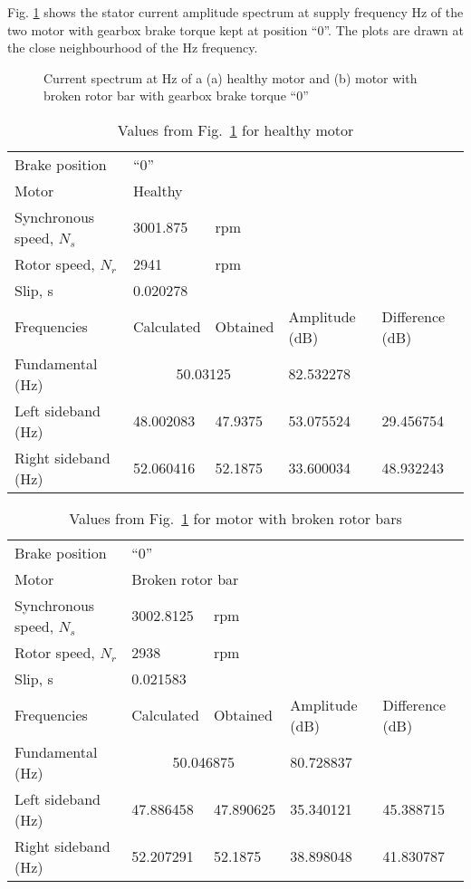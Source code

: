 \documentclass[a4paper,11pt]{report}
\begin{document}
\clearpage
Fig. \ref{hb050ss} shows the stator current amplitude spectrum at supply frequency \unit[50]{Hz} of the two motor with gearbox brake torque kept at position ``0''. The plots are drawn at the close neighbourhood of the \unit[50]{Hz} frequency.

\begin{figure}[htbp]
\centering
\subfigure[]{\texttt{[image: h050]}}
\subfigure[]{\texttt{[image: b050]}}
\caption{Current spectrum at \unit[50]{Hz} of a (a) healthy motor and (b) motor with broken rotor bar with gearbox brake torque ``0''} \label{hb050ss}
\end{figure}

\begin{table}[h]
\centering
\begin{tabular}{lllll}
Brake position	& ``0'' & & & \\			
Motor &	\multicolumn{4}{l}{Healthy} \\ 
Synchronous speed, $N_{s}$	& 3001.875& rpm & & \\			
Rotor speed, $N_{r}$ 	  	& 2941	& rpm& & \\		
Slip, s			  	& \multicolumn{4}{l}{0.020278} \\			
Frequencies 		  	& Calculated & Obtained & Amplitude (dB) & Difference (dB) \\
Fundamental (Hz)		& \multicolumn{2}{c}{50.03125}	& 82.532278	&  \\ 
Left sideband (Hz) 		& 48.002083 & 47.9375 & 53.075524 & 29.456754 \\
Right sideband (Hz)		& 52.060416 & 52.1875 & 33.600034 & 48.932243 
\end{tabular}
\caption{Values from Fig.~\ref{hb050ss} for healthy motor} \label{h050sst}
\end{table}

\begin{table}[h]
\centering
\begin{tabular}{lllll}
Brake position	& ``0'' & & & \\			
Motor &	\multicolumn{4}{l}{Broken rotor	bar} \\ 
Synchronous speed, $N_{s}$	& 3002.8125	& rpm & & \\			
Rotor speed, $N_{r}$ 	  	& 2938	& rpm& & \\		
Slip, s			  	& \multicolumn{4}{l}{0.021583} \\			
Frequencies 		  	& Calculated & Obtained & Amplitude (dB) & Difference (dB) \\
Fundamental (Hz)		& \multicolumn{2}{c}{50.046875}	& 80.728837	&  \\ 
Left sideband (Hz) 		& 47.886458 & 47.890625 & 35.340121 & 45.388715\\
Right sideband (Hz)		& 52.207291 & 52.1875 &   38.898048 & 41.830787 
\end{tabular}
\caption{Values from Fig.~\ref{hb050ss} for motor with broken rotor bars} \label{b050sst}
\end{table}
\end{document}
